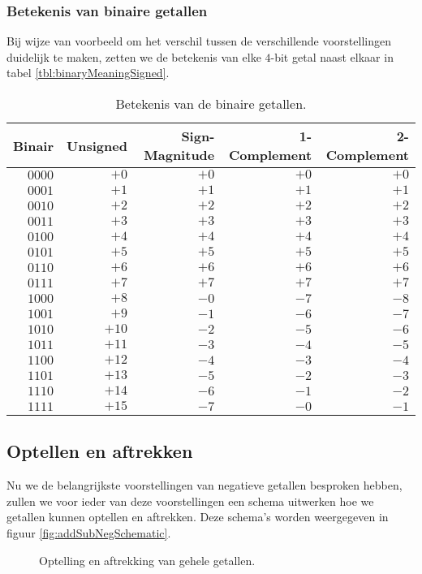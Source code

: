 \subsubsection{Betekenis van binaire getallen}
Bij wijze van voorbeeld om het verschil tussen de verschillende voorstellingen duidelijk te maken, zetten we de betekenis van elke $4$-bit getal naast elkaar in tabel \ref{tbl:binaryMeaningSigned}.
\begin{table}[hbt]
\centering
\begin{tabular}{r|rrrr}
Binair&Unsigned&Sign-Magnitude&1-Complement&2-Complement\\\hline
$0000$&$+0$&$+0$&$+0$&$+0$\\
$0001$&$+1$&$+1$&$+1$&$+1$\\
$0010$&$+2$&$+2$&$+2$&$+2$\\
$0011$&$+3$&$+3$&$+3$&$+3$\\
$0100$&$+4$&$+4$&$+4$&$+4$\\
$0101$&$+5$&$+5$&$+5$&$+5$\\
$0110$&$+6$&$+6$&$+6$&$+6$\\
$0111$&$+7$&$+7$&$+7$&$+7$\\
$1000$&$+8$&$-0$&$-7$&$-8$\\
$1001$&$+9$&$-1$&$-6$&$-7$\\
$1010$&$+10$&$-2$&$-5$&$-6$\\
$1011$&$+11$&$-3$&$-4$&$-5$\\
$1100$&$+12$&$-4$&$-3$&$-4$\\
$1101$&$+13$&$-5$&$-2$&$-3$\\
$1110$&$+14$&$-6$&$-1$&$-2$\\
$1111$&$+15$&$-7$&$-0$&$-1$
\end{tabular}
\caption{Betekenis van de binaire getallen.}
\end{table}
\subsection{Optellen en aftrekken}
Nu we de belangrijkste voorstellingen van negatieve getallen besproken hebben, zullen we voor ieder van deze voorstellingen een schema uitwerken hoe we getallen kunnen optellen en aftrekken. Deze schema's worden weergegeven in figuur \ref{fig:addSubNegSchematic}.
\begin{figure}[hbt]
\centering
{}
\caption{Optelling en aftrekking van gehele getallen.}
\end{figure}
